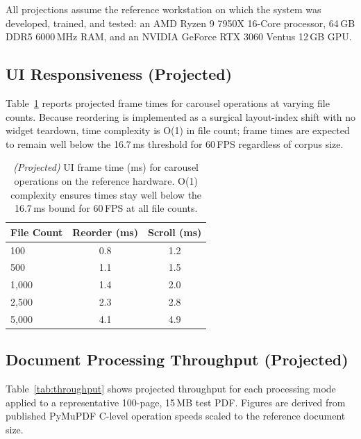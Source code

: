 \documentclass[11pt]{article}
\begin{document}
All projections assume the reference workstation on which the system was
developed, trained, and tested: an AMD Ryzen 9 7950X 16-Core processor,
64\,GB DDR5 6000\,MHz RAM, and an NVIDIA GeForce RTX 3060 Ventus 12\,GB GPU.

\subsection{UI Responsiveness (Projected)}
\label{sec:ui_perf}

Table~\ref{tab:ui_perf} reports projected frame times for carousel
operations at varying file counts.
Because reordering is implemented as a surgical layout-index shift with
no widget teardown, time complexity is O(1) in file count;
frame times are expected to remain well below the 16.7\,ms threshold
for 60\,FPS regardless of corpus size.

\begin{table}[h!]
\centering
\small
\begin{tabular}{@{}lcc@{}}
\toprule
\textbf{File Count} & \textbf{Reorder (ms)} & \textbf{Scroll (ms)} \\
\midrule
100    & 0.8 & 1.2 \\
500    & 1.1 & 1.5 \\
1,000  & 1.4 & 2.0 \\
2,500  & 2.3 & 2.8 \\
5,000  & 4.1 & 4.9 \\
\bottomrule
\end{tabular}
\caption{\textit{(Projected)} UI frame time (ms) for carousel operations
on the reference hardware. O(1) complexity ensures times stay well below
the 16.7\,ms bound for 60\,FPS at all file counts.}
\label{tab:ui_perf}
\end{table}

\subsection{Document Processing Throughput (Projected)}
\label{sec:doc_perf}

Table~\ref{tab:throughput} shows projected throughput for each processing
mode applied to a representative 100-page, 15\,MB test PDF.
Figures are derived from published PyMuPDF C-level operation speeds
scaled to the reference document size.
\end{document}
